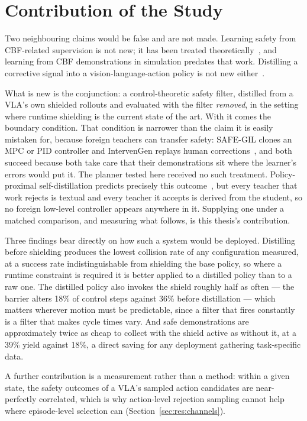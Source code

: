 \documentclass[a4paper,11pt]{report}
\begin{document}
\section{Contribution of the Study}\label{sec:conc:contribution}

Two neighbouring claims would be false and are not made. Learning safety from CBF-related
supervision is not new; it has been treated theoretically~\cite{cosner2022il_cbf}, and learning
from CBF demonstrations in simulation predates that work. Distilling a corrective signal into a
vision-language-action policy is not new either~\cite{wang2026roadvla}.

What is new is the conjunction: a control-theoretic safety filter, distilled from a VLA's own
shielded rollouts and evaluated with the filter \emph{removed}, in the setting where runtime
shielding is the current state of the art. With it comes the boundary condition. That condition is
narrower than the claim it is easily mistaken for, because foreign teachers can transfer safety:
SAFE-GIL clones an MPC or PID controller and IntervenGen replays human
corrections~\cite{ciftci2025safegil,hoque2024intervengen}, and both succeed because both take care
that their demonstrations sit where the learner's errors would put it. The planner tested here
received no such treatment. Policy-proximal self-distillation predicts precisely this
outcome~\cite{wang2026roadvla}, but every teacher that work rejects is textual and every teacher it
accepts is derived from the student, so no foreign low-level controller appears anywhere in it.
Supplying one under a matched comparison, and measuring what follows, is this thesis's
contribution.

Three findings bear directly on how such a system would be deployed. Distilling before shielding
produces the lowest collision rate of any configuration measured, at a success rate
indistinguishable from shielding the base policy, so where a runtime constraint is required it is
better applied to a distilled policy than to a raw one. The distilled policy also invokes the shield
roughly half as often --- the barrier alters 18\% of control steps against 36\% before distillation
--- which matters wherever motion must be predictable, since a filter that fires constantly is a
filter that makes cycle times vary. And safe demonstrations are approximately twice as cheap to
collect with the shield active as without it, at a 39\% yield against 18\%, a direct saving for any
deployment gathering task-specific data.

A further contribution is a measurement rather than a method: within a given state, the safety
outcomes of a VLA's sampled action candidates are near-perfectly correlated, which is why
action-level rejection sampling cannot help where episode-level selection can
(Section~\ref{sec:res:channels}).
\end{document}
